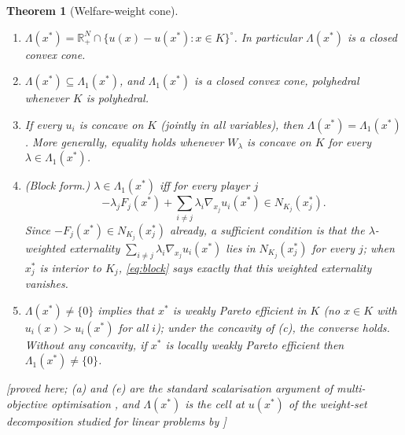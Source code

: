 \documentclass[11pt,a4paper]{article}
\theoremstyle{plain}
\newtheorem{theorem}{Theorem}[section]
\theoremstyle{definition}
\theoremstyle{remark}
\newcommand{\R}{\mathbb{R}}
\newcommand{\NC}{N}
\newcommand{\status}[1]{\textsf{\small [#1]}}
\newcommand{\Lam}{\Lambda}
\newcommand{\Lone}{\Lambda_{1}}
\begin{document}
\begin{theorem}[Welfare-weight cone]\label{thm:cone}
\begin{enumerate}[leftmargin=2em,label=(\alph*)]
\item $\Lam(x^*)=\R^N_+\cap\{u(x)-u(x^*):x\in K\}^\circ$. In particular $\Lam(x^*)$ is a closed convex cone.
\item $\Lam(x^*)\subseteq\Lone(x^*)$, and $\Lone(x^*)$ is a closed convex cone, polyhedral whenever $K$ is polyhedral.
\item If every $u_i$ is concave on $K$ (jointly in all variables), then $\Lam(x^*)=\Lone(x^*)$. More generally, equality holds whenever $W_\lambda$ is concave on $K$ for every $\lambda\in\Lone(x^*)$.
\item (Block form.) $\lambda\in\Lone(x^*)$ iff for every player $j$
\begin{equation}\label{eq:block}
-\lambda_jF_j(x^*)+\sum_{i\ne j}\lambda_i\nabla_{x_j}u_i(x^*)\in\NC_{K_j}(x_j^*).
\end{equation}
Since $-F_j(x^*)\in\NC_{K_j}(x_j^*)$ already, a sufficient condition is that the $\lambda$-weighted externality $\sum_{i\ne j}\lambda_i\nabla_{x_j}u_i(x^*)$ lies in $\NC_{K_j}(x_j^*)$ for every $j$; when $x_j^*$ is interior to $K_j$, \eqref{eq:block} says exactly that this weighted externality vanishes.
\item $\Lam(x^*)\ne\{0\}$ implies that $x^*$ is weakly Pareto efficient in $K$ (no $x\in K$ with $u_i(x)>u_i(x^*)$ for all $i$); under the concavity of (c), the converse holds. Without any concavity, if $x^*$ is locally weakly Pareto efficient then $\Lone(x^*)\ne\{0\}$.
\end{enumerate}
\status{proved here; (a) and (e) are the standard scalarisation argument of multi-objective optimisation \citep{geoffrion1968,ehrgott2005}, and $\Lam(x^*)$ is the cell at $u(x^*)$ of the weight-set decomposition studied for linear problems by \citet{bensonSun2000}}
\end{theorem}
\end{document}
